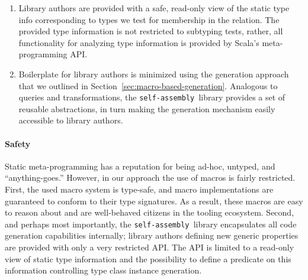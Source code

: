 \documentclass[preprint,nocopyrightspace]{sigplanconf}
\newcommand{\selfassembly}{\texttt{self-assembly~}}
\begin{document}
\begin{enumerate}
\item Library authors are provided with a safe, read-only view of the static
      type info corresponding to types we test for membership in the relation.
      The provided type information is not restricted to subtyping tests, rather,
      all functionality for analyzing type information is provided by Scala's
      meta-programming API.

\item Boilerplate for library authors is minimized using the generation approach
      that we outlined in Section~\ref{sec:macro-based-generation}. Analogous to
      queries and transformations, the \selfassembly library provides a set of
      reusable abstractions, in turn making the generation mechanism easily
      accessible to library authors.
\end{enumerate}

\paragraph{Safety}
Static meta-programming has a reputation for being ad-hoc, untyped, and
``anything-goes.'' However, in our approach the use of macros is fairly
restricted. First, the used macro system is type-safe, and macro
implementations are guaranteed to conform to their type signatures. As a result,
these macros are easy to reason about and are well-behaved citizens in the tooling
ecosystem. Second, and perhaps most importantly, the \selfassembly library
encapsulates all code generation capabilities internally; library authors
defining new generic properties are provided with only a very restricted API.
The API is limited to a read-only view of static type information and the
possibility to define a predicate on this information controlling type class
instance generation.






\end{document}
